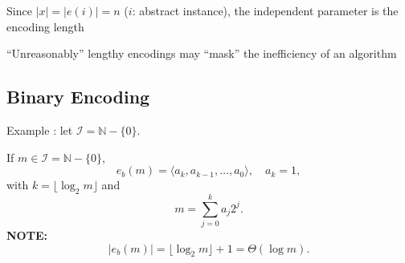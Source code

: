 Since $|x|=|e(i)|=n$ ($i$: abstract instance), the independent parameter is the encoding length

``Unreasonably'' lengthy encodings may ``mask'' the inefficiency of an algorithm


\subsection{Binary Encoding}

Example :  let $\mathcal I=\mathbb N-\{0\}$.

If $m\in\mathcal I=\mathbb N-\{0\}$,
\[
e_b(m)=\langle a_k,a_{k-1},\ldots,a_0\rangle,\quad a_k=1,
\]
with $k=\lfloor\log_2 m\rfloor$ and
\[
m=\sum_{j=0}^k a_j2^j.
\]
\textbf{NOTE:}
\[
|e_b(m)|=\lfloor\log_2 m\rfloor+1=\Theta(\log m).
\]
